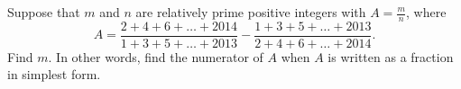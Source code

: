 Suppose that $m$ and $n$ are relatively prime positive integers with $A = \tfrac mn$, where
\[ A = \frac{2+4+6+\dots+2014}{1+3+5+\dots+2013} - \frac{1+3+5+\dots+2013}{2+4+6+\dots+2014}. \] Find $m$. In other words, find the numerator of $A$ when $A$ is written as a fraction in simplest form.

